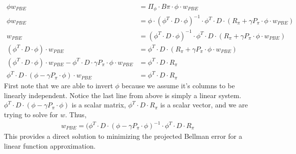 \documentclass{article}
\begin{document}
\begin{align*}
\phi w_{PBE} & = \Pi_\phi \cdot B\pi \cdot \phi \cdot w_{PBE} \\
\phi w_{PBE} & = \phi \cdot (\phi^T \cdot D \cdot \phi)^{-1} \cdot \phi^T \cdot D \cdot (R_\pi + \gamma P_\pi \cdot \phi \cdot w_{PBE}) \\
w_{PBE} & = (\phi^T \cdot D \cdot \phi)^{-1} \cdot \phi^T \cdot D \cdot (R_\pi + \gamma P_\pi \cdot \phi \cdot w_{PBE}) \\
 (\phi^T \cdot D \cdot \phi) \cdot w_{PBE} & = \phi^T \cdot D \cdot (R_\pi + \gamma P_\pi \cdot \phi \cdot w_{PBE}) \\
  (\phi^T \cdot D \cdot \phi) \cdot w_{PBE} - \phi^T \cdot D \cdot \gamma P_\pi \cdot \phi \cdot w_{PBE} & = \phi^T \cdot D \cdot R_\pi \\
  \phi^T \cdot D \cdot (\phi - \gamma P_\pi \cdot \phi) \cdot w_{PBE} & = \phi^T \cdot D \cdot R_\pi
\end{align*}
First note that we are able to invert $\phi$ because we assume it's columns to be linearly independent. Notice the last line from above is simply a linear system. $\phi^T \cdot D \cdot (\phi - \gamma P_\pi \cdot \phi)$ is a scalar matrix, $\phi^T \cdot D \cdot R_\pi$ is a scalar vector, and we are trying to solve for $w$. Thus, 
\begin{align*}
w_{PBE} = (\phi^T \cdot D \cdot (\phi - \gamma P_\pi \cdot \phi)^{-1} \cdot \phi^T \cdot D \cdot R_\pi
\end{align*}
This provides a direct solution to minimizing the projected Bellman error for a linear function approximation.
\end{document}
